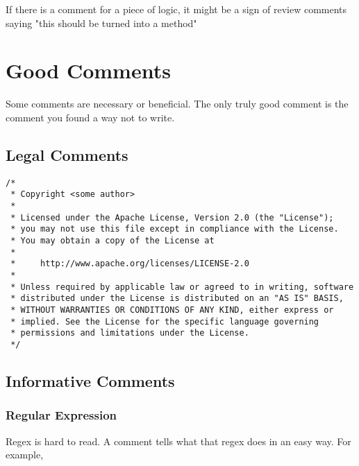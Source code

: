 \begin{marker}
If there is a comment for a piece of logic, it might be a sign of review comments saying "this should be turned into a method"
\end{marker}

\section{Good Comments}

Some comments are necessary or beneficial. The only truly good comment is the comment you found a way not to write.

\subsection{Legal Comments}

\begin{tcolorbox}[breakable, colback=green!10!white, colframe=green!85!black, title = An Example]

\begin{verbatim}
/*
 * Copyright <some author>
 *
 * Licensed under the Apache License, Version 2.0 (the "License");
 * you may not use this file except in compliance with the License.
 * You may obtain a copy of the License at
 *
 *     http://www.apache.org/licenses/LICENSE-2.0
 *
 * Unless required by applicable law or agreed to in writing, software
 * distributed under the License is distributed on an "AS IS" BASIS,
 * WITHOUT WARRANTIES OR CONDITIONS OF ANY KIND, either express or
 * implied. See the License for the specific language governing
 * permissions and limitations under the License.
 */
\end{verbatim}

\end{tcolorbox}

\subsection{Informative Comments}

\subsubsection{Regular Expression}

Regex is hard to read. A comment tells what that regex does in an easy way. For example, 


